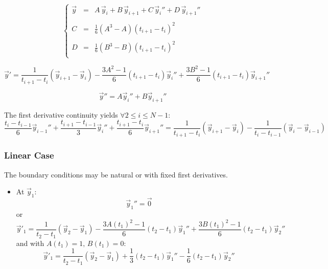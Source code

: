 \documentclass[aps,12pt]{revtex4}
\begin{document}
\begin{equation}
\left\lbrace
\begin{array}{rcl}
	\vec{y}   & = & A \, \vec{y}_i + B \, \vec{y}_{i+1} + C \, \vec{y}_i'' + D \, \vec{y}_{i+1}''\\
	\\
	C & = & \frac{1}{6} \left(A^3 - A\right) (t_{i+1}-t_i)^2\\
	\\
	D & = & \frac{1}{6} \left(B^3 - B\right) (t_{i+1}-t_i)^2\\
\end{array}
\right.
\end{equation}

\begin{equation}
	\vec{y}' = \dfrac{1}{t_{i+1}-t_i} \left(\vec{y}_{i+1}-\vec{y}_i\right) 
	- \dfrac{3A^2-1}{6} (t_{i+1}-t_i) \vec{y}_i''
	+ \dfrac{3B^2-1}{6} (t_{i+1}-t_i) \vec{y}_{i+1}''
\end{equation}	


\begin{equation}
	\vec{y}'' = A \vec{y}_i'' + B \vec{y}_{i+1}''
\end{equation}

The first derivative continuity yields $\forall 2\leq i \leq N-1$:
\begin{equation}
 	\dfrac{t_{i}-t_{i-1}}{6} \vec{y}_{i-1}'' + 
	\dfrac{t_{i+1}-t_{i-1}}{3} \vec{y}_i''
	+\dfrac{t_{i+1}-t_{i}}{6} \vec{y}_{i+1}''  = 
	\dfrac{1}{t_{i+1}-t_i} \left( \vec{y}_{i+1} - \vec{y}_{i} \right) -
	\dfrac{1}{t_{i}-t_{i-1}} \left( \vec{y}_i - \vec{y}_{i-1} \right) 
\end{equation}


\subsubsection{Linear Case}
The boundary conditions may be natural or with fixed first derivatives.
\begin{itemize}
\item At $\vec{y}_1$:
\begin{equation}
	\vec{y}_1'' = \vec{0} 
\end{equation}
or
\begin{equation}
\vec{y}'_1 = \dfrac{1}{t_{2}-t_1} \left(\vec{y}_{2}-\vec{y}_1\right) 
	- \dfrac{3A(t_1)^2-1}{6} (t_{2}-t_1) \vec{y}_1''
	+ \dfrac{3B(t_1)^2-1}{6} (t_{2}-t_1) \vec{y}_{2}''
\end{equation}
and with $A(t_1)=1,\,B(t_1)=0$:
\begin{equation}
\vec{y}'_1  = \dfrac{1}{t_{2}-t_1} \left(\vec{y}_{2}-\vec{y}_1\right) 
	+ \dfrac{1}{3} (t_{2}-t_1) \vec{y}_1''
	- \dfrac{1}{6} (t_{2}-t_1) \vec{y}_{2}''
\end{equation}
\end{itemize}
\end{document}
